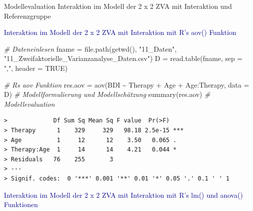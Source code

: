 \documentclass[
  8pt,
  ignorenonframetext,
]{beamer}
\newenvironment{Shaded}{\begin{snugshade}}{\end{snugshade}}
\newcommand{\AttributeTok}[1]{\textcolor[rgb]{0.77,0.63,0.00}{#1}}
\newcommand{\CommentTok}[1]{\textcolor[rgb]{0.56,0.35,0.01}{\textit{#1}}}
\newcommand{\ConstantTok}[1]{\textcolor[rgb]{0.00,0.00,0.00}{#1}}
\newcommand{\FunctionTok}[1]{\textcolor[rgb]{0.00,0.00,0.00}{#1}}
\newcommand{\NormalTok}[1]{#1}
\newcommand{\OtherTok}[1]{\textcolor[rgb]{0.56,0.35,0.01}{#1}}
\newcommand{\SpecialCharTok}[1]{\textcolor[rgb]{0.00,0.00,0.00}{#1}}
\newcommand{\StringTok}[1]{\textcolor[rgb]{0.31,0.60,0.02}{#1}}
\begin{document}
\begin{frame}[fragile]{\small Modellevaluation \textbar{} Interaktion im
Modell der 2 x 2 ZVA mit Interaktion und Referenzgruppe}
\protect\hypertarget{modellevaluation-interaktion-im-modell-der-2-x-2-zva-mit-interaktion-und-referenzgruppe-2}{}
\small

\textcolor{darkblue}{Interaktion im Modell der 2 x 2 ZVA mit Interaktion mit R's aov() Funktion}
\tiny {} \vspace{1mm}

\begin{Shaded}
\begin{Highlighting}[]
\CommentTok{\# Dateneinlesen}
\NormalTok{fname      }\OtherTok{=} \FunctionTok{file.path}\NormalTok{(}\FunctionTok{getwd}\NormalTok{(), }\StringTok{"11\_Daten"}\NormalTok{, }\StringTok{"11\_Zweifaktorielle\_Varianzanalyse\_Daten.csv"}\NormalTok{)}
\NormalTok{D          }\OtherTok{=} \FunctionTok{read.table}\NormalTok{(fname, }\AttributeTok{sep =} \StringTok{","}\NormalTok{, }\AttributeTok{header =} \ConstantTok{TRUE}\NormalTok{)}

\CommentTok{\# R\textquotesingle{}s aov Funktion}
\NormalTok{res.aov    }\OtherTok{=} \FunctionTok{aov}\NormalTok{(BDI }\SpecialCharTok{\textasciitilde{}}\NormalTok{ Therapy }\SpecialCharTok{+}\NormalTok{ Age }\SpecialCharTok{+}\NormalTok{ Age}\SpecialCharTok{:}\NormalTok{Therapy, }\AttributeTok{data =}\NormalTok{ D)  }\CommentTok{\# Modellformulierung und Modellschätzung}
\FunctionTok{summary}\NormalTok{(res.aov)                                               }\CommentTok{\# Modellevaluation}
\end{Highlighting}
\end{Shaded}

\begin{verbatim}
>             Df Sum Sq Mean Sq F value  Pr(>F)    
> Therapy      1    329     329   98.18 2.5e-15 ***
> Age          1     12      12    3.50   0.065 .  
> Therapy:Age  1     14      14    4.21   0.044 *  
> Residuals   76    255       3                    
> ---
> Signif. codes:  0 '***' 0.001 '**' 0.01 '*' 0.05 '.' 0.1 ' ' 1
\end{verbatim}

\vspace{2mm}

\small

\textcolor{darkblue}{Interaktion im Modell der 2 x 2 ZVA mit Interaktion mit R's lm() und anova() Funktionen}
\tiny {} \vspace{1mm}


\end{frame}
\end{document}

